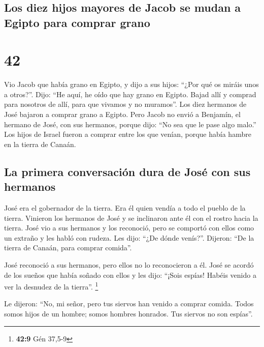 \hypertarget{los-diez-hijos-mayores-de-jacob-se-mudan-a-egipto-para-comprar-grano}{%
\subsection{Los diez hijos mayores de Jacob se mudan a Egipto para
comprar
grano}\label{los-diez-hijos-mayores-de-jacob-se-mudan-a-egipto-para-comprar-grano}}

\hypertarget{section-41}{%
\section{42}\label{section-41}}

 Vio Jacob que había grano en Egipto, y dijo a sus hijos:
``¿Por qué os miráis unos a otros?''.  Dijo: ``He aquí, he
oído que hay grano en Egipto. Bajad allí y comprad para nosotros de
allí, para que vivamos y no muramos''.  Los diez hermanos
de José bajaron a comprar grano a Egipto.  Pero Jacob no
envió a Benjamín, el hermano de José, con sus hermanos, porque dijo:
``No sea que le pase algo malo.''  Los hijos de Israel
fueron a comprar entre los que venían, porque había hambre en la tierra
de Canaán.

\hypertarget{la-primera-conversaciuxf3n-dura-de-josuxe9-con-sus-hermanos}{%
\subsection{La primera conversación dura de José con sus
hermanos}\label{la-primera-conversaciuxf3n-dura-de-josuxe9-con-sus-hermanos}}

 José era el gobernador de la tierra. Era él quien vendía
a todo el pueblo de la tierra. Vinieron los hermanos de José y se
inclinaron ante él con el rostro hacia la tierra.  José
vio a sus hermanos y los reconoció, pero se comportó con ellos como un
extraño y les habló con rudeza. Les dijo: ``¿De dónde venís?''. Dijeron:
``De la tierra de Canaán, para comprar comida''.

 José reconoció a sus hermanos, pero ellos no lo
reconocieron a él.  José se acordó de los sueños que había
soñado con ellos y les dijo: ``¡Sois espías! Habéis venido a ver la
desnudez de la tierra''. \footnote{\textbf{42:9} Gén 37,5-9}

 Le dijeron: ``No, mi señor, pero tus siervos han venido
a comprar comida.  Todos somos hijos de un hombre; somos
hombres honrados. Tus siervos no son espías''.

